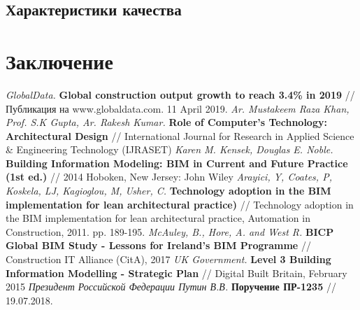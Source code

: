 \documentclass[a4paper,14pt]{extreport} %
\begin{document}
\newpage
\section{Характеристики качества}


\newpage
\chapter{Заключение}

\begin{thebibliography}{1}
{\small
{} {\it GlobalData.}
\textbf{Global construction output growth to reach 3.4\% in 2019} // Публикация на www.globaldata.com. 11 April 2019.
 \textit{Ar. Mustakeem Raza Khan, Prof. S.K Gupta, Ar. Rakesh Kumar.}
\textbf{Role of Computer’s Technology: Architectural Design} // International Journal for Research in Applied Science \& Engineering Technology (IJRASET)
 {\it Karen M. Kensek, Douglas E. Noble.}
\textbf{Building Information Modeling: BIM in Current and Future Practice (1st ed.)} // 2014 Hoboken, New Jersey: John Wiley
 {\it Arayici, Y, Coates, P, Koskela, LJ, Kagioglou, M, Usher, C.}
\textbf{Technology adoption in the BIM implementation for lean architectural practice)} // Technology adoption in the BIM implementation for lean architectural practice, Automation in Construction, 2011. pp. 189-195.
 {\it McAuley, B., Hore, A. and West R.}
\textbf{BICP Global BIM Study - Lessons for Ireland’s BIM Programme} // Construction IT Alliance (CitA), 2017
 {\it UK Government.}
\textbf{Level 3 Building Information Modelling - Strategic Plan} // Digital Built Britain, February 2015
 {\it Президент Российской Федерации Путин В.В.}
\textbf{Поручение ПР-1235} // 19.07.2018.
}
\end{thebibliography}
\end{document}
